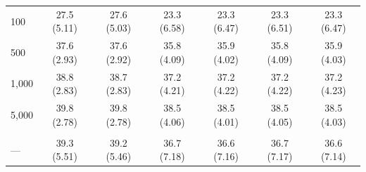 \documentclass[AMA,STIX1COL,doublespace]{WileyNJD-v2}
\begin{document}
\begin{table}
\begin{tabular}[t]{lcccccc}
\addlinespace[0.75em]
\multicolumn{7}{l}{\textbf{10 predictors, 490 junk}}\\
\hline
\hspace{1em}100 & 27.5 (5.11) & 27.6 (5.03) & 23.3 (6.58) & 23.3 (6.47) & 23.3 (6.51) & 23.3 (6.47)\\
\hspace{1em}500 & 37.6 (2.93) & 37.6 (2.92) & 35.8 (4.09) & 35.9 (4.02) & 35.8 (4.09) & 35.9 (4.03)\\
\hspace{1em}1,000 & 38.8 (2.83) & 38.7 (2.83) & 37.2 (4.21) & 37.2 (4.22) & 37.2 (4.22) & 37.2 (4.23)\\
\hspace{1em}5,000 & 39.8 (2.78) & 39.8 (2.78) & 38.5 (4.06) & 38.5 (4.01) & 38.5 (4.05) & 38.5 (4.03)\\
\addlinespace[0.75em]
\multicolumn{7}{l}{\textbf{Overall}}\\
\hline
\hspace{1em}--- & 39.3 (5.51) & 39.2 (5.46) & 36.7 (7.18) & 36.6 (7.16) & 36.7 (7.17) & 36.6 (7.14)\\
\bottomrule
\end{tabular}
\end{table}
\end{document}
